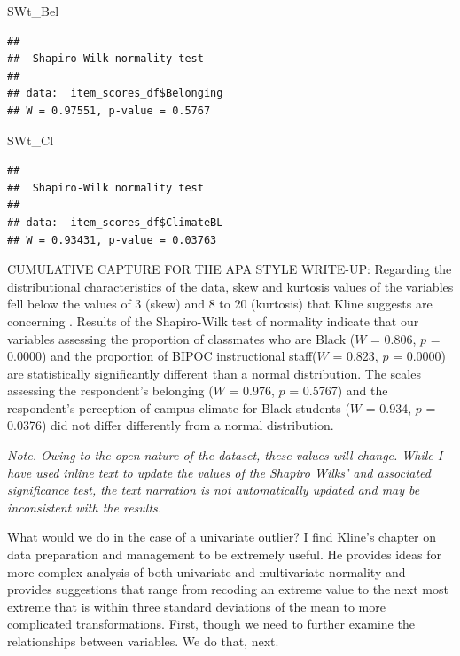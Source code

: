 \documentclass[
  english,
]{book}
\newenvironment{Shaded}{\begin{snugshade}}{\end{snugshade}}
\newcommand{\NormalTok}[1]{#1}
\begin{document}
\begin{Shaded}
\begin{Highlighting}[]
\NormalTok{SWt\_Bel}
\end{Highlighting}
\end{Shaded}

\begin{verbatim}
## 
##  Shapiro-Wilk normality test
## 
## data:  item_scores_df$Belonging
## W = 0.97551, p-value = 0.5767
\end{verbatim}

\begin{Shaded}
\begin{Highlighting}[]
\NormalTok{SWt\_Cl}
\end{Highlighting}
\end{Shaded}

\begin{verbatim}
## 
##  Shapiro-Wilk normality test
## 
## data:  item_scores_df$ClimateBL
## W = 0.93431, p-value = 0.03763
\end{verbatim}

CUMULATIVE CAPTURE FOR THE APA STYLE WRITE-UP: Regarding the distributional characteristics of the data, skew and kurtosis values of the variables fell below the values of 3 (skew) and 8 to 20 (kurtosis) that Kline suggests are concerning \citeyearpar{kline_principles_2016}. Results of the Shapiro-Wilk test of normality indicate that our variables assessing the proportion of classmates who are Black (\(W\) = 0.806, \(p\) = 0.0000) and the proportion of BIPOC instructional staff(\(W\) = 0.823, \(p\) = 0.0000) are statistically significantly different than a normal distribution. The scales assessing the respondent's belonging (\(W\) = 0.976, \(p\) = 0.5767) and the respondent's perception of campus climate for Black students (\(W\) = 0.934, \(p\) = 0.0376) did not differ differently from a normal distribution.

\emph{Note. Owing to the open nature of the dataset, these values will change. While I have used inline text to update the values of the Shapiro Wilks' and associated significance test, the text narration is not automatically updated and may be inconsistent with the results.}

What would we do in the case of a univariate outlier? I find Kline's \citeyearpar{kline_principles_2016} chapter on data preparation and management to be extremely useful. He provides ideas for more complex analysis of both univariate and multivariate normality and provides suggestions that range from recoding an extreme value to the next most extreme that is within three standard deviations of the mean to more complicated transformations. First, though we need to further examine the relationships between variables. We do that, next.
\end{document}
